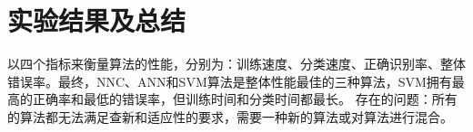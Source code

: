 \documentclass[a4papper]{article}
\begin{document}
  	\section{实验结果及总结}
 	\par\setlength{\parindent}{2em} %
 	以四个指标来衡量算法的性能，分别为：训练速度、分类速度、正确识别率、整体错误率。最终，NNC、ANN和SVM算法是整体性能最佳的三种算法，SVM拥有最高的正确率和最低的错误率，但训练时间和分类时间都最长。
 	存在的问题：所有的算法都无法满足查新和适应性的要求，需要一种新的算法或对算法进行混合。
  	
  
\end{document}
